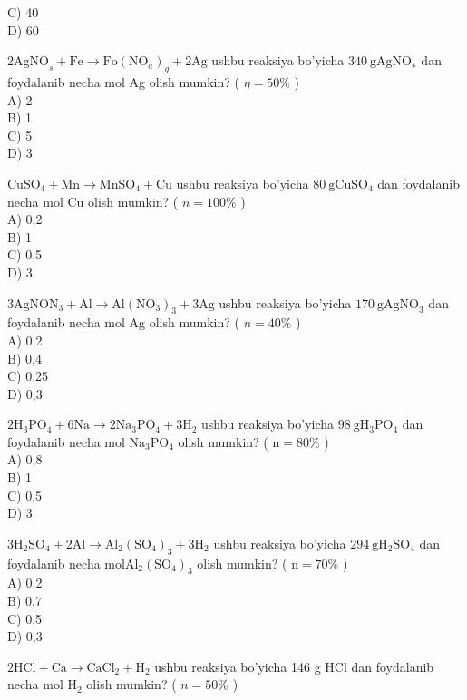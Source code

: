 C) 40\\
D) 60
  \item $2 \mathrm{AgNO}_{s}+\mathrm{Fe} \rightarrow \mathrm{Fo}\left(\mathrm{NO}_{a}\right)_{g}+2 \mathrm{Ag}$ ushbu reaksiya bo'yicha $340 \mathrm{~g} \mathrm{AgNO}_{*}$ dan foydalanib necha mol Ag olish mumkin? ( $\eta=50 \%$ )\\
A) 2\\
B) 1\\
C) 5\\
D) 3
  \item $\mathrm{CuSO}_{4}+\mathrm{Mn} \rightarrow \mathrm{MnSO}_{4}+\mathrm{Cu}$ ushbu reaksiya bo'yicha $80 \mathrm{~g} \mathrm{CuSO}_{4}$ dan foydalanib necha mol Cu olish mumkin? ( $n=100 \%$ )\\
A) 0,2\\
B) 1\\
C) 0,5\\
D) 3
  \item $3 \mathrm{AgNO} \mathrm{N}_{3}+\mathrm{Al} \rightarrow \mathrm{Al}\left(\mathrm{NO}_{3}\right)_{3}+3 \mathrm{Ag}$ ushbu reaksiya bo'yicha $170 \mathrm{~g} \mathrm{AgNO}_{3}$ dan foydalanib necha mol Ag olish mumkin? ( $n=40 \%$ )\\
A) 0,2\\
B) 0,4\\
C) 0,25\\
D) 0,3
  \item $2 \mathrm{H}_{3} \mathrm{PO}_{4}+6 \mathrm{Na} \rightarrow 2 \mathrm{Na}_{3} \mathrm{PO}_{4}+3 \mathrm{H}_{2}$ ushbu reaksiya bo'yicha $98 \mathrm{~g} \mathrm{H}_{3} \mathrm{PO}_{4}$ dan foydalanib necha mol $\mathrm{Na}_{3} \mathrm{PO}_{4}$ olish mumkin? ( $\mathrm{n}=80 \%$ )\\
A) 0,8\\
B) 1\\
C) 0,5\\
D) 3
  \item $3 \mathrm{H}_{2} \mathrm{SO}_{4}+2 \mathrm{Al} \rightarrow \mathrm{Al}_{2}\left(\mathrm{SO}_{4}\right)_{3}+3 \mathrm{H}_{2}$ ushbu reaksiya bo'yicha $294 \mathrm{~g} \mathrm{H}_{2} \mathrm{SO}_{4}$ dan foydalanib necha $\mathrm{mol} \mathrm{Al}_{2}\left(\mathrm{SO}_{4}\right)_{3}$ olish mumkin? ( $\mathrm{n}=70 \%$ )\\
A) 0,2\\
B) 0,7\\
C) 0,5\\
D) 0,3
  \item $2 \mathrm{HCl}+\mathrm{Ca} \rightarrow \mathrm{CaCl}_{2}+\mathrm{H}_{2}$ ushbu reaksiya bo'yicha 146 g HCl dan foydalanib necha mol $\mathrm{H}_{2}$ olish mumkin? ( $n=50 \%$ )\\

